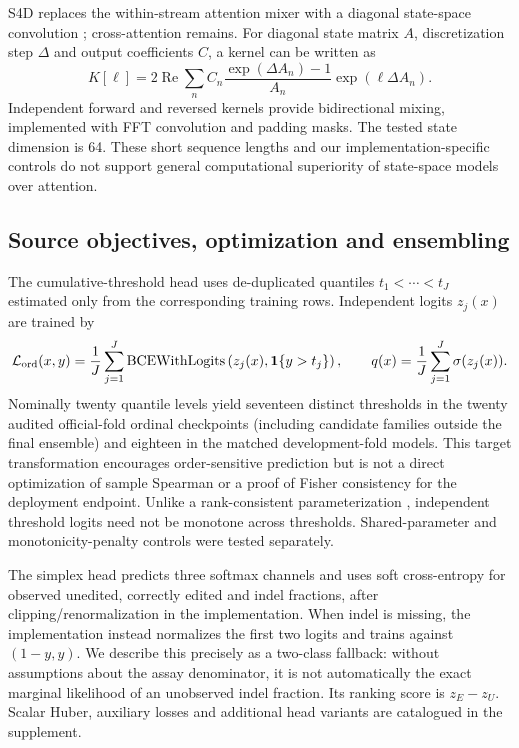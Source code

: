 S4D replaces the within-stream attention mixer with a diagonal state-space convolution \citep{gu2022s4d}; cross-attention remains. For diagonal state matrix $A$, discretization step $\Delta$ and output coefficients $C$, a kernel can be written as
\begin{equation}
K[\ell]=2\operatorname{Re}\sum_n C_n\frac{\exp(\Delta A_n)-1}{A_n}\exp(\ell\Delta A_n).
\end{equation}
Independent forward and reversed kernels provide bidirectional mixing, implemented with FFT convolution and padding masks. The tested state dimension is 64. These short sequence lengths and our implementation-specific controls do not support general computational superiority of state-space models over attention.

\subsection{Source objectives, optimization and ensembling}
The cumulative-threshold head uses de-duplicated quantiles $t_1<\cdots<t_J$ estimated only from the corresponding training rows. Independent logits $z_j(x)$ are trained by
\begin{equation}
\mathcal L_{\rm ord}(x,y)=\frac1J\sum_{j=1}^J\operatorname{BCEWithLogits}\left(z_j(x),\mathbf1\{y>t_j\}\right),\qquad
q(x)=\frac1J\sum_{j=1}^J\sigma(z_j(x)).
\label{eq:ordinal}
\end{equation}
Nominally twenty quantile levels yield seventeen distinct thresholds in the twenty audited official-fold ordinal checkpoints (including candidate families outside the final ensemble) and eighteen in the matched development-fold models. This target transformation encourages order-sensitive prediction but is not a direct optimization of sample Spearman or a proof of Fisher consistency for the deployment endpoint. Unlike a rank-consistent parameterization \citep{cao2020}, independent threshold logits need not be monotone across thresholds. Shared-parameter and monotonicity-penalty controls were tested separately.

The simplex head predicts three softmax channels and uses soft cross-entropy for observed unedited, correctly edited and indel fractions, after clipping/renormalization in the implementation. When indel is missing, the implementation instead normalizes the first two logits and trains against $(1-y,y)$. We describe this precisely as a two-class fallback: without assumptions about the assay denominator, it is not automatically the exact marginal likelihood of an unobserved indel fraction. Its ranking score is $z_E-z_U$. Scalar Huber, auxiliary losses and additional head variants are catalogued in the supplement.

